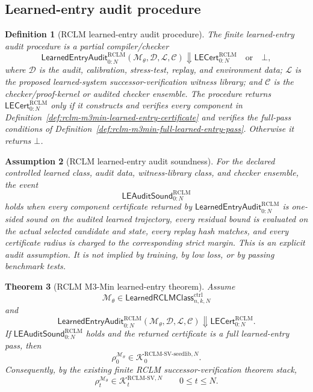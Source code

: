\documentclass[11pt,a4paper]{article}
\newtheorem{theorem}{Theorem}[section]
\newtheorem{definition}[theorem]{Definition}
\newtheorem{assumption}[theorem]{Assumption}
\newcommand{\Kcal}{\mathcal K}
\newcommand{\RCLM}{\mathrm{RCLM}}
\begin{document}
\subsection{Learned-entry audit procedure}

\begin{definition}[RCLM learned-entry audit procedure]
\label{def:rclm-m3min-learned-entry-audit}
The finite learned-entry audit procedure is a partial compiler/checker
\[
\mathsf{LearnedEntryAudit}_{0:N}^{\RCLM}
(\mathcal M_\theta,\mathcal D,\mathcal L,\mathcal C)
\Downarrow
\mathsf{LECert}_{0:N}^{\RCLM}
\quad\text{or}\quad
\bot,
\]
where $\mathcal D$ is the audit, calibration, stress-test, replay, and environment data; $\mathcal L$ is the proposed learned-system successor-verification witness library; and $\mathcal C$ is the checker/proof-kernel or audited checker ensemble.  The procedure returns $\mathsf{LECert}_{0:N}^{\RCLM}$ only if it constructs and verifies every component in Definition~\ref{def:rclm-m3min-learned-entry-certificate} and verifies the full-pass conditions of Definition~\ref{def:rclm-m3min-full-learned-entry-pass}.  Otherwise it returns $\bot$.
\end{definition}

\begin{assumption}[RCLM learned-entry audit soundness]
\label{ass:rclm-m3min-learned-entry-audit-soundness}
For the declared controlled learned class, audit data, witness-library class, and checker ensemble, the event
\[
\mathsf{LEAuditSound}_{0:N}^{\RCLM}
\]
holds when every component certificate returned by $\mathsf{LearnedEntryAudit}_{0:N}^{\RCLM}$ is one-sided sound on the audited learned trajectory, every residual bound is evaluated on the actual selected candidate and state, every replay hash matches, and every certificate radius is charged to the corresponding strict margin.  This is an explicit audit assumption.  It is not implied by training, by low loss, or by passing benchmark tests.
\end{assumption}

\begin{theorem}[RCLM M3-Min learned-entry theorem]
\label{thm:rclm-m3min-learned-entry}
Assume
\[
\mathcal M_\theta\in\mathsf{LearnedRCLMClass}_{n,k,N}^{\mathrm{ctrl}}
\]
and
\[
\mathsf{LearnedEntryAudit}_{0:N}^{\RCLM}
(\mathcal M_\theta,\mathcal D,\mathcal L,\mathcal C)
\Downarrow
\mathsf{LECert}_{0:N}^{\RCLM}.
\]
If $\mathsf{LEAuditSound}_{0:N}^{\RCLM}$ holds and the returned certificate is a full learned-entry pass, then
\[
\boxed{
\rho_0^{\mathcal M_\theta}
\in
\Kcal_0^{\RCLM\text{-}\mathrm{SV\mbox{-}seedlib},N}.
}
\]
Consequently, by the existing finite RCLM successor-verification theorem stack,
\[
\boxed{
\rho_t^{\mathcal M_\theta}
\in
\Kcal_t^{\RCLM\text{-}\mathrm{SV},N}
\qquad
0\le t\le N.
}
\]
\end{theorem}
\end{document}
